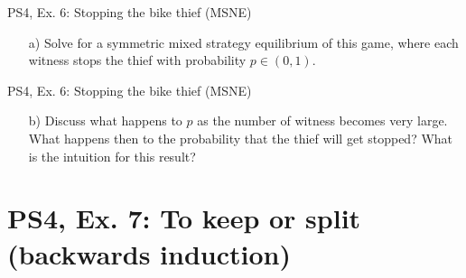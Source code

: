 \begin{frame}{PS4, Ex. 6: Stopping the bike thief (MSNE)}
    \begin{itemize}
      \item[a)] Solve for a symmetric mixed strategy equilibrium of this game, where each witness stops the thief with probability $p\in(0,1)$.
    \end{itemize}
\end{frame}
\begin{frame}{PS4, Ex. 6: Stopping the bike thief (MSNE)}
    \begin{itemize}
      \item[b)] Discuss what happens to $p$ as the number of witness becomes very large. What happens then to the probability that the thief will get stopped? What is the intuition for this result?
    \end{itemize}
\end{frame}

\section{PS4, Ex. 7: To keep or split (backwards induction)}

